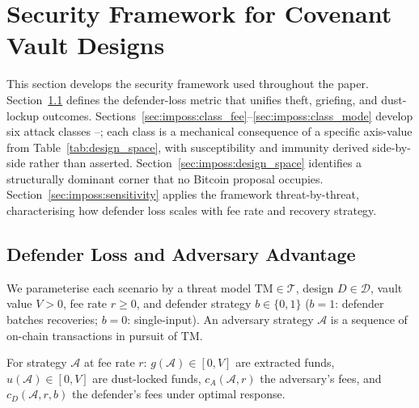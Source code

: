 
\section{Security Framework for Covenant Vault Designs}
\label{sec:impossibility}

This section develops the security framework used throughout the
paper. Section~\ref{sec:imposs:framework} defines the defender-loss
metric that unifies theft, griefing, and dust-lockup outcomes.
Sections~\ref{sec:imposs:class_fee}--\ref{sec:imposs:class_mode}
develop six attack classes \classfee{}--\classmode{}; each class is a
mechanical consequence of a specific axis-value from
Table~\ref{tab:design_space}, with susceptibility and immunity
derived side-by-side rather than asserted.
Section~\ref{sec:imposs:design_space} identifies a structurally
dominant corner that no Bitcoin proposal occupies.
Section~\ref{sec:imposs:sensitivity} applies the framework
threat-by-threat, characterising how defender loss scales with fee
rate and recovery strategy.

\subsection{Defender Loss and Adversary Advantage}
\label{sec:imposs:framework}

We parameterise each scenario by a threat model
$\mathrm{TM} \in \mathcal{T}$, design $D \in \mathcal{D}$, vault
value $V > 0$, fee rate $r \geq 0$, and defender strategy
$b \in \{0, 1\}$ ($b = 1$: defender batches recoveries; $b = 0$:
single-input). An adversary strategy $\mathcal{A}$ is a sequence of
on-chain transactions in pursuit of $\mathrm{TM}$.

\begin{definition}
\label{def:strategy}
For strategy $\mathcal{A}$ at fee rate $r$: $g(\mathcal{A}) \in [0,V]$
are extracted funds, $u(\mathcal{A}) \in [0,V]$ are dust-locked funds,
$c_A(\mathcal{A}, r)$ the adversary's fees, and $c_D(\mathcal{A}, r, b)$
the defender's fees under optimal response.
\end{definition}

